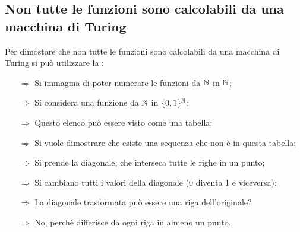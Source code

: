 


\subsection{Non tutte le funzioni sono calcolabili da una macchina di Turing}

Per dimostare che non tutte le funzioni sono calcolabili da una macchina di Turing  si può
utilizzare la :
\begin{itemize}
    \item [$\Rightarrow$] Si immagina di poter numerare le funzioni da $\mathbb{N}$ in $\mathbb{N}$;
    \item [$\Rightarrow$] Si considera una funzione da $\mathbb{N}$ in $\{0,1\}^{\mathbb{N}}$;
    \item [$\Rightarrow$] Questo elenco può essere visto come una tabella;
    \item [$\Rightarrow$] Si vuole dimostrare che esiste una sequenza che non è in questa tabella;
    \item [$\Rightarrow$] Si prende la diagonale, che interseca tutte le righe in un punto;
    \item [$\Rightarrow$] Si cambiano tutti i valori della diagonale (0 diventa 1 e viceversa);
    \item [$\Rightarrow$] La diagonale trasformata può essere una riga dell'originale?
    \item [$\Rightarrow$] No, perchè differisce da ogni riga in almeno un punto.
\end{itemize}

